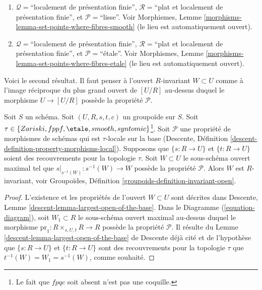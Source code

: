 \begin{remark}
\begin{enumerate}
$\mathcal{R} =$``plat et localement de présentation finie'', et
$\mathcal{P}=$``syntomique'' ; voir
Morphismes, Lemme \ref{morphisms-lemma-set-points-where-fibres-lci}
(le lieu est automatiquement ouvert).
\item[(7)] $\mathcal{Q} =$``localement de présentation finie'',
$\mathcal{R} =$``plat et localement de présentation finie'', et
$\mathcal{P}=$``lisse''. Voir
Morphismes, Lemme \ref{morphisms-lemma-set-points-where-fibres-smooth}
(le lieu est automatiquement ouvert).
\item[(8)] $\mathcal{Q} =$``localement de présentation finie'',
$\mathcal{R} =$``plat et localement de présentation finie'', et
$\mathcal{P}=$``\'etale''. Voir
Morphismes, Lemme \ref{morphisms-lemma-set-points-where-fibres-etale}
(le lieu est automatiquement ouvert).
\end{enumerate}
\end{remark}

\noindent
Voici le second résultat. Il faut penser à l'ouvert $R$-invariant $W \subset U$ comme à
l'image réciproque du plus grand ouvert de $[U/R]$ au-dessus duquel
le morphisme $U \to [U/R]$ possède la propriété $\mathcal{P}$.

\begin{lemma}
\label{lemma-property-invariant}
Soit $S$ un schéma.
Soit $(U, R, s, t, c)$ un groupoïde sur $S$.
Soit $\tau \in \{Zariski, \linebreak[0] fppf,
\linebreak[0] \etale, \linebreak[0]
smooth, \linebreak[0] syntomic\}$\footnote{Le fait que $fpqc$ soit absent
n'est pas une coquille.}. Soit $\mathcal{P}$ une propriété de morphismes de schémas
qui est $\tau$-locale sur la base
(Descente, Définition \ref{descent-definition-property-morphisms-local}).
Supposons que $\{s : R \to U\}$ et $\{t : R \to U\}$ soient des recouvrements pour la
topologie $\tau$. Soit $W \subset U$ le sous-schéma ouvert maximal tel que
$s|_{s^{-1}(W)} : s^{-1}(W) \to W$ possède la propriété $\mathcal{P}$.
Alors $W$ est $R$-invariant, voir
Groupoïdes, Définition \ref{groupoids-definition-invariant-open}.
\end{lemma}

\begin{proof}
L'existence et les propriétés de l'ouvert $W \subset U$ sont décrites dans
Descente, Lemme \ref{descent-lemma-largest-open-of-the-base}.
Dans le
Diagramme (\ref{equation-diagram}),
soit $W_1 \subset R$ le sous-schéma ouvert maximal au-dessus duquel le morphisme
$\text{pr}_1 : R \times_{s, U, t} R \to R$ possède la propriété $\mathcal{P}$.
Il résulte du
Lemme \ref{descent-lemma-largest-open-of-the-base} de Descente déjà cité
et de l'hypothèse que $\{s : R \to U\}$ et $\{t : R \to U\}$ sont des recouvrements
pour la topologie $\tau$ que $t^{-1}(W) = W_1 = s^{-1}(W)$, comme souhaité.
\end{proof}

